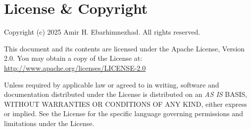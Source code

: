 \section*{License \& Copyright}

\noindent
Copyright (c) 2025 Amir H. Ebarhimnezhad.
All rights reserved.

\noindent
This document and its contents are licensed under the Apache License, Version 2.0.
You may obtain a copy of the License at: \url{http://www.apache.org/licenses/LICENSE-2.0}

\noindent
Unless required by applicable law or agreed to in writing, software and documentation
distributed under the License is distributed on an \emph{AS IS} BASIS, WITHOUT WARRANTIES
OR CONDITIONS OF ANY KIND, either express or implied.
See the License for the specific language
governing permissions and limitations under the License.
